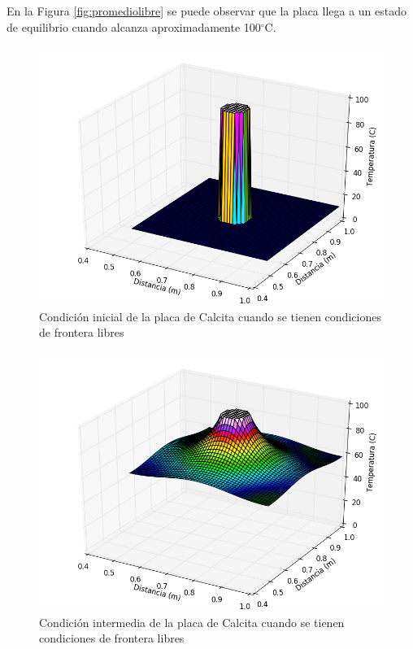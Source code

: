 \documentclass[]{article}
\begin{document}
En la Figura \ref{fig:promediolibre} se puede observar que la placa llega a un estado de equilibrio cuando alcanza aproximadamente 100$^\circ$C.\\
\begin{figure}[H]
    \centering
    \includegraphics[width=\linewidth]{placalibreinicial.png}
    \caption{Condición inicial de la placa de Calcita cuando se tienen condiciones de frontera libres}
    \label{fig:placalibreinicial}
\end{figure}

\begin{figure}[H]
    \centering
    \includegraphics[width=\linewidth]{placalibreintermedio1.png}
    \caption{Condición intermedia de la placa de Calcita cuando se tienen condiciones de frontera libres}
    \label{fig:placalibreintermedio1}
\end{figure}
\end{document}
